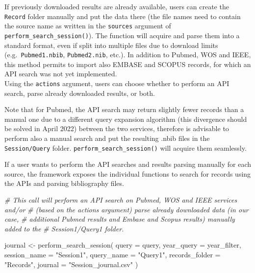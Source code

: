 \documentclass[
]{article}
\newenvironment{Shaded}{\begin{snugshade}}{\end{snugshade}}
\newcommand{\AttributeTok}[1]{\textcolor[rgb]{0.77,0.63,0.00}{#1}}
\newcommand{\CommentTok}[1]{\textcolor[rgb]{0.56,0.35,0.01}{\textit{#1}}}
\newcommand{\FunctionTok}[1]{\textcolor[rgb]{0.00,0.00,0.00}{#1}}
\newcommand{\NormalTok}[1]{#1}
\newcommand{\OtherTok}[1]{\textcolor[rgb]{0.56,0.35,0.01}{#1}}
\newcommand{\StringTok}[1]{\textcolor[rgb]{0.31,0.60,0.02}{#1}}
\begin{document}
If previously downloaded results are already available, users can create
the \texttt{Record} folder manually and put the data there (the file
names need to contain the source name as written in the \texttt{sources}
argument of \texttt{perform\_search\_session()}). The function will
acquire and parse them into a standard format, even if split into
multiple files due to download limits (e.g.~\texttt{Pubmed1.nbib},
\texttt{Pubmed2.nib}, etc.). In addition to Pubmed, WOS and IEEE, this
method permits to import also EMBASE and SCOPUS records, for which an
API search was not yet implemented.\\
Using the \texttt{actions} argument, users can choose whether to perform
an API search, parse already downloaded results, or both.

Note that for Pubmed, the API search may return slightly fewer records
than a manual one due to a different query expansion algorithm (this
divergence should be solved in April 2022) between the two services,
therefore is advisable to perform also a manual search and put the
resulting .nbib files in the \texttt{Session/Query} folder.
\texttt{perform\_search\_session()} will acquire them seamlessly.

If a user wants to perform the API searches and results parsing manually
for each source, the framework exposes the individual functions to
search for records using the APIs and parsing bibliography files.

\begin{Shaded}
\begin{Highlighting}[]
\CommentTok{\# This call will perform an API search on Pubmed, WOS and IEEE services and/or}
\CommentTok{\# (based on the \textasciigrave{}actions\textasciigrave{} argument) parse already downloaded data (in our case,}
\CommentTok{\# additional Pubmed results and Embase and Scopus results) manually added to the}
\CommentTok{\# Session1/Query1 folder.}

\NormalTok{journal }\OtherTok{\textless{}{-}} \FunctionTok{perform\_search\_session}\NormalTok{(}
  \AttributeTok{query =}\NormalTok{ query, }\AttributeTok{year\_query =}\NormalTok{ year\_filter,}
  \AttributeTok{session\_name =} \StringTok{"Session1"}\NormalTok{, }\AttributeTok{query\_name =} \StringTok{"Query1"}\NormalTok{,}
  \AttributeTok{records\_folder =} \StringTok{"Records"}\NormalTok{,}
  \AttributeTok{journal =} \StringTok{"Session\_journal.csv"}
\NormalTok{)}
\end{Highlighting}
\end{Shaded}
\end{document}
